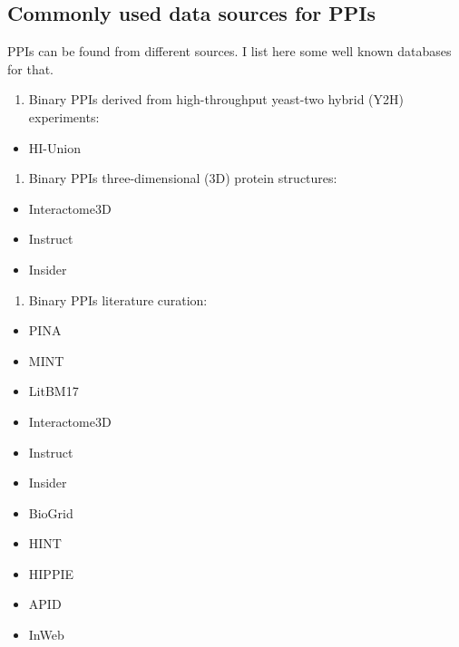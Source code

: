\documentclass[
]{book}
\providecommand{\tightlist}{%
  \setlength{\itemsep}{0pt}\setlength{\parskip}{0pt}}
\begin{document}
\hypertarget{commonly-used-data-sources-for-ppis}{%
\subsection{Commonly used data sources for PPIs}\label{commonly-used-data-sources-for-ppis}}

PPIs can be found from different sources. I list here some well known databases for that.

\begin{enumerate}
\def\labelenumi{\arabic{enumi}.}
\tightlist
\item
  Binary PPIs derived from high-throughput yeast-two hybrid (Y2H) experiments:
\end{enumerate}

\begin{itemize}
\tightlist
\item
  HI-Union \citep{Luck2020}
\end{itemize}

\begin{enumerate}
\def\labelenumi{\arabic{enumi}.}
\setcounter{enumi}{1}
\tightlist
\item
  Binary PPIs three-dimensional (3D) protein structures:
\end{enumerate}

\begin{itemize}
\tightlist
\item
  Interactome3D \citep{Mosca2013}
\item
  Instruct \citep{Meyer2013}
\item
  Insider \citep{Meyer2018}
\end{itemize}

\begin{enumerate}
\def\labelenumi{\arabic{enumi}.}
\setcounter{enumi}{2}
\tightlist
\item
  Binary PPIs literature curation:
\end{enumerate}

\begin{itemize}
\tightlist
\item
  PINA \citep{Cowley2012}
\item
  MINT \citep{Licata2012}
\item
  LitBM17 \citep{Luck2020}
\item
  Interactome3D
\item
  Instruct
\item
  Insider
\item
  BioGrid \citep{Chatr-Aryamontri2017}
\item
  HINT \citep{Das2012}
\item
  HIPPIE \citep{Alanis-Lobato2017}
\item
  APID \citep{Alonso-Lopez2019a}
\item
  InWeb \citep{li2016}
\end{itemize}
\end{document}
